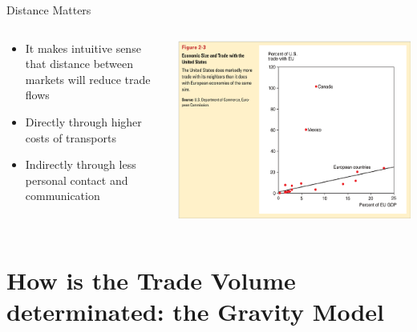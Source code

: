 \documentclass[10pt,hyperref={CJKbookmarks=true},xcolor=dvipsnames,aspectratio=169]{beamer}
\begin{document}
\begin{frame}{Distance Matters}


\begin{columns}[onlytextwidth]
\begin{column}{0.4\textwidth}
\begin{itemize}
\item It makes intuitive sense that distance between markets will reduce
trade flows 
\item Directly through higher costs of transports 
\item Indirectly through less personal contact and communication
\end{itemize}

\end{column}
\begin{column}{0.6\textwidth}
\centering \includegraphics[width=0.8\columnwidth]{fig/gravity/tra11}
\end{column}
\end{columns}

\end{frame}



\section{How is the Trade Volume determinated: the Gravity Model }
\end{document}
